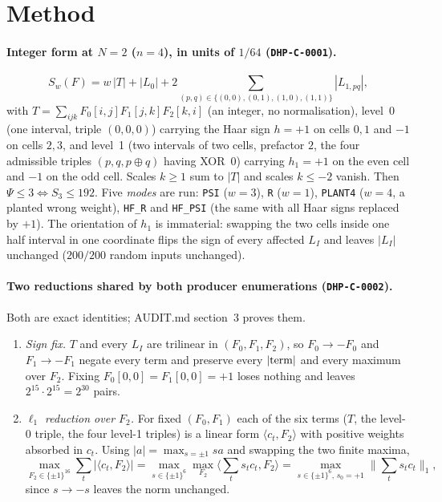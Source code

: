 \documentclass[10pt]{article}
\begin{document}
\section{Method}\label{sec:method}
\paragraph{Integer form at $N=2$ ($n=4$), in units of $1/64$ (\texttt{DHP-C-0001}).}
\[
S_w(F)=w\,|T|+|L_0|+2\sum_{(p,q)\in\{(0,0),(0,1),(1,0),(1,1)\}}|L_{1,pq}|,
\]
with $T=\sum_{ijk}F_0[i,j]F_1[j,k]F_2[k,i]$ (an integer, no normalisation), level~0 (one interval, triple $(0,0,0)$) carrying the Haar sign $h=+1$ on cells $0,1$ and $-1$ on cells $2,3$, and level~1 (two intervals of two cells, prefactor $2$, the four admissible triples $(p,q,p\oplus q)$ having XOR~$0$) carrying $h_1=+1$ on the even cell and $-1$ on the odd cell. Scales $k\ge1$ sum to $|T|$ and scales $k\le-2$ vanish. Then $\Psi\le3\iff S_3\le192$. Five \emph{modes} are run: \texttt{PSI} ($w=3$), \texttt{R} ($w=1$), \texttt{PLANT4} ($w=4$, a planted wrong weight), \texttt{HF\_R} and \texttt{HF\_PSI} (the same with all Haar signs replaced by $+1$). The orientation of $h_1$ is immaterial: swapping the two cells inside one half interval in one coordinate flips the sign of every affected $L_I$ and leaves $|L_I|$ unchanged ($200/200$ random inputs unchanged).

\paragraph{Two reductions shared by both producer enumerations (\texttt{DHP-C-0002}).} Both are exact identities; AUDIT.md section~3 proves them.
\begin{enumerate}\itemsep=0pt
\item \emph{Sign fix.} $T$ and every $L_I$ are trilinear in $(F_0,F_1,F_2)$, so $F_0\to-F_0$ and $F_1\to-F_1$ negate every term and preserve every $|{\rm term}|$ and every maximum over $F_2$. Fixing $F_0[0,0]=F_1[0,0]=+1$ loses nothing and leaves $2^{15}\cdot2^{15}=2^{30}$ pairs.
\item \emph{$\ell_1$ reduction over $F_2$.} For fixed $(F_0,F_1)$ each of the six terms ($T$, the level-0 triple, the four level-1 triples) is a linear form $\langle c_t,F_2\rangle$ with positive weights absorbed in $c_t$. Using $|a|=\max_{s=\pm1}sa$ and swapping the two finite maxima,
\[
\max_{F_2\in\{\pm1\}^{16}}\sum_t|\langle c_t,F_2\rangle|=\max_{s\in\{\pm1\}^6}\max_{F_2}\Big\langle\sum_ts_tc_t,F_2\Big\rangle=\max_{s\in\{\pm1\}^6,\,s_0=+1}\Big\|\sum_ts_tc_t\Big\|_1 ,
\]
since $s\to-s$ leaves the norm unchanged.
\end{enumerate}
\end{document}
